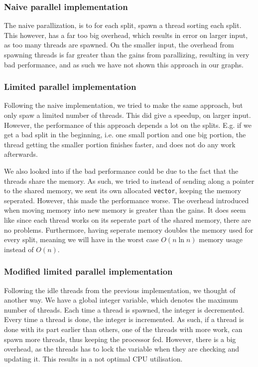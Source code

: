 \subsubsection{Naive parallel implementation}
The naive parallization, is to for each split, spawn a thread sorting each
split. This however, has a far too big overhead, which results in error on
larger input, as too many threads are spawned. On the smaller input, the
overhead from spawning threads is far greater than the gains from parallizing,
resulting in very bad performance, and as such we have not shown this approach
in our graphs.

\subsubsection{Limited parallel implementation}
Following the naive implementation, we tried to make the same approach, but
only spaw a limited number of threads. This did give a speedup, on larger
input. However, the performance of this approach depends a lot on the splits.
E.g. if we get a bad split in the beginning, i.e. one small portion and one big
portion, the thread getting the smaller portion finishes faster, and does not
do any work afterwards.

We also looked into if the bad performance could be due to the fact that the
threads share the memory. As such, we tried to instead of sending along a
pointer to the shared memory, we sent its own allocated \texttt{vector},
keeping the memory seperated. However, this made the performance worse. The
overhead introduced when moving memory into new memory is greater than the
gains. It does seem like since each thread works on its seperate part of the
shared memory, there are no problems. Furthermore, having seperate memory
doubles the memory used for every split, meaning we will have in the worst case
$O(n \ln n)$ memory usage instead of $O(n)$.

\subsubsection{Modified limited parallel implementation}
Following the idle threads from the previous implementation, we thought of
another way. We have a global integer variable, which denotes the maximum
number of threads. Each time a thread is spawned, the integer is decremented.
Every time a thread is done, the integer is incremented. As such, if a thread
is done with its part earlier than others, one of the threads with more work,
can spawn more threads, thus keeping the processor fed. However, there is a big
overhead, as the threads has to lock the variable when they are checking and
updating it. This results in a not optimal CPU utilisation.

